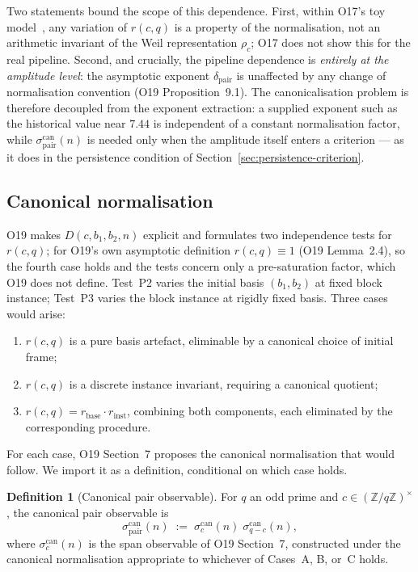 \documentclass[11pt,a4paper]{article}
\theoremstyle{definition}
\newtheorem{definition}[theorem]{Definition}
\theoremstyle{remark}
\begin{document}
      Two statements bound the scope of this dependence.
      First, within O17's toy model~\cite{Beau2026a21}, any variation of $r(c,q)$ is a
      property of the normalisation, not an arithmetic invariant of the Weil
      representation $\rho_c$; O17 does not show this for the real pipeline.
      Second, and crucially, the pipeline dependence is \emph{entirely at
  the amplitude level}: the asymptotic exponent
      $\delta_{\mathrm{pair}}$ is unaffected by any change of
      normalisation convention (O19 Proposition~9.1).
      The canonicalisation problem is therefore decoupled from the
      exponent extraction: a supplied exponent such as the historical value near $7.44$ is
      independent of a constant normalisation factor, while
      $\sigma_{\mathrm{pair}}^{\mathrm{can}}(n)$ is needed only when the
      amplitude itself enters a criterion --- as it does in the
      persistence condition of
      Section~\ref{sec:persistence-criterion}.

    \subsection{Canonical normalisation}
      \label{sec:canonical-def}

      O19 makes $D(c, b_1, b_2, n)$ explicit and formulates two independence
      tests for $r(c,q)$; for O19's own asymptotic definition $r(c,q)\equiv1$ (O19 Lemma~2.4), so the fourth case holds and the tests concern only a pre-saturation factor, which O19 does not define.
      Test~P2 varies the initial basis $(b_1, b_2)$ at fixed block
      instance; Test~P3 varies the block instance at rigidly fixed basis.
      Three cases would arise:
      \begin{enumerate}[label=(\Alph*)]
  \item $r(c,q)$ is a pure basis artefact, eliminable by a
  canonical choice of initial frame;
  \item $r(c,q)$ is a discrete instance invariant, requiring a
  canonical quotient;
  \item $r(c,q) = r_{\mathrm{base}} \cdot r_{\mathrm{inst}}$,
  combining both components, each eliminated by the corresponding
  procedure.
      \end{enumerate}
      For each case, O19 Section~7 proposes the canonical normalisation that would follow.
      We import it as a definition, conditional on which case holds.

      \begin{definition}[Canonical pair observable]
        \label{def:sigma-can-recap}
        For $q$ an odd prime and
        $c \in (\mathbb{Z}/q\mathbb{Z})^\times$, the canonical pair
        observable is
        \[
          \sigma_{\mathrm{pair}}^{\mathrm{can}}(n)
          \;:=\; \sigma_c^{\mathrm{can}}(n)\;\sigma_{q-c}^{\mathrm{can}}(n),
        \]
        where $\sigma_c^{\mathrm{can}}(n)$ is the span observable of O19
        Section~7, constructed under the canonical normalisation appropriate
        to whichever of Cases~A, B, or~C holds.
      \end{definition}
\end{document}
